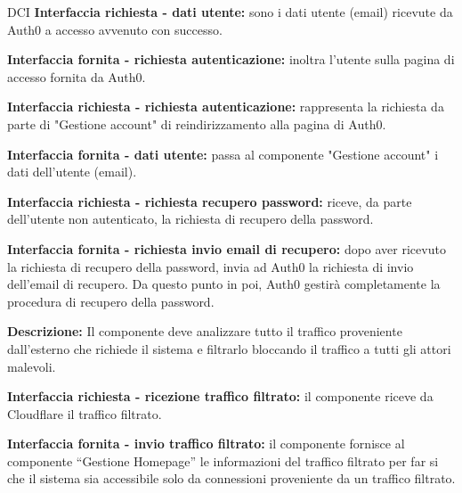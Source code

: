 \begin{listaPersonale}{DCI}
    \textbf{Interfaccia richiesta - dati utente:} sono i dati utente (email) ricevute da Auth0 a accesso avvenuto con successo.

    \textbf{Interfaccia fornita - richiesta autenticazione:} inoltra l'utente sulla pagina di accesso fornita da Auth0.

    \textbf{Interfaccia richiesta - richiesta autenticazione:} rappresenta la richiesta da parte di "Gestione account" di reindirizzamento alla pagina di Auth0.

    \textbf{Interfaccia fornita - dati utente:} passa al componente "Gestione account" i dati dell'utente (email).

    \textbf{Interfaccia richiesta - richiesta recupero password:} riceve, da parte dell'utente non autenticato, la richiesta di recupero della password.

    \textbf{Interfaccia fornita - richiesta invio email di recupero:} dopo aver ricevuto la richiesta di recupero della password, invia ad Auth0 la richiesta di invio dell'email di recupero. Da questo punto in poi, Auth0 gestirà completamente la procedura di recupero della password.



    \textbf{Descrizione:} Il componente deve analizzare tutto il traffico proveniente dall'esterno che richiede il sistema e filtrarlo bloccando il traffico a tutti gli attori malevoli.

    \textbf{Interfaccia richiesta - ricezione traffico filtrato:} il componente riceve da Cloudflare il traffico filtrato.

    \textbf{Interfaccia fornita - invio traffico filtrato:} il componente fornisce al componente “Gestione Homepage” le informazioni del traffico filtrato per far si che il sistema sia accessibile solo da connessioni proveniente da un traffico filtrato.

\end{listaPersonale}